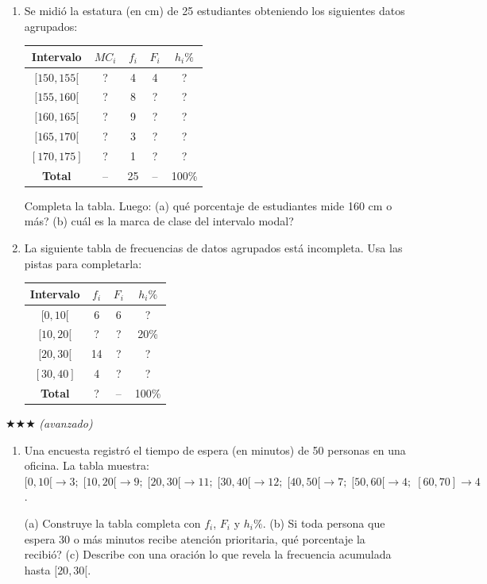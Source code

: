 \documentclass[11pt, letterpaper]{article}
\begin{document}
\begin{enumerate}[label=\textbf{\arabic*.}, leftmargin=*, resume]
  \item Se midi\'o la estatura (en cm) de 25 estudiantes obteniendo los siguientes datos agrupados:
  \begin{center}
  \renewcommand{\arraystretch}{1.3}
  \begin{tabular}{c c c c c}
  \toprule
  Intervalo & $MC_i$ & $f_i$ & $F_i$ & $h_i\%$\\
  \midrule
  $[150,155[$ & ? & 4 & 4 & ?\\
  $[155,160[$ & ? & 8 & ? & ?\\
  $[160,165[$ & ? & 9 & ? & ?\\
  $[165,170[$ & ? & 3 & ? & ?\\
  $[170,175]$ & ? & 1 & ? & ?\\
  \midrule
  \textbf{Total} & -- & 25 & -- & 100\%\\
  \bottomrule
  \end{tabular}
  \end{center}
  Completa la tabla. Luego: (a) \textquestiondown qu\'e porcentaje de estudiantes mide 160 cm o m\'as? (b) \textquestiondown cu\'al es la marca de clase del intervalo modal?

  \item La siguiente tabla de frecuencias de datos agrupados est\'a incompleta. Usa las pistas para completarla:
  \begin{center}
  \renewcommand{\arraystretch}{1.3}
  \begin{tabular}{c c c c}
  \toprule
  Intervalo & $f_i$ & $F_i$ & $h_i\%$\\
  \midrule
  $[0,10[$   & 6  & 6  & ?\\
  $[10,20[$  & ?  & ?  & 20\%\\
  $[20,30[$  & 14 & ?  & ?\\
  $[30,40]$  & 4  & ?  & ?\\
  \midrule
  \textbf{Total} & ? & -- & 100\%\\
  \bottomrule
  \end{tabular}
  \end{center}
\end{enumerate}

$\bigstar\bigstar\bigstar$ \textit{(avanzado)}

\begin{enumerate}[label=\textbf{\arabic*.}, leftmargin=*, resume]
  \item Una encuesta registr\'o el tiempo de espera (en minutos) de 50 personas en una oficina. La tabla muestra:
  $[0,10[\to 3;\; [10,20[\to 9;\; [20,30[\to 11;\; [30,40[\to 12;\; [40,50[\to 7;\; [50,60[\to 4;\; [60,70]\to 4$.

  (a) Construye la tabla completa con $f_i$, $F_i$ y $h_i\%$.
  (b) Si toda persona que espera 30 o m\'as minutos recibe atenci\'on prioritaria, \textquestiondown qu\'e porcentaje la recibi\'o?
  (c) Describe con una oraci\'on lo que revela la frecuencia acumulada hasta $[20,30[$.
  \vspace{3cm}
\end{enumerate}
\end{document}
